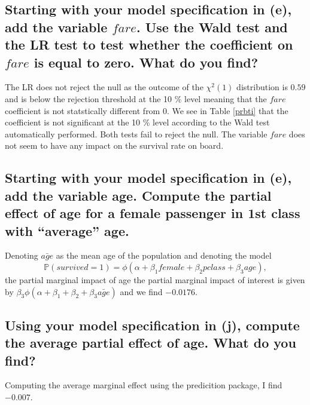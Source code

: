 \documentclass[12pt]{article}
\begin{document}
\subsection{Starting with your model specification in (e), add the variable $fare$. Use the Wald test and the LR test to test whether the coefficient on $fare$ is equal to zero. What do you find?}

The LR does not reject the null as the outcome of the $\chi^2(1)$ distribution is $0.59$ and is below the rejection threshold at the 10 \% level meaning that the $fare$ coefficient is not statstically different from 0. We see in Table \ref{prbti} that the coefficient is not significant at the 10 \% level according to the Wald test automatically performed. Both tests fail to reject the null. The variable $fare$ does not seem to have any impact on the survival rate on board.

\subsection{Starting with your model specification in (e), add the variable age. Compute the partial effect of age for a female passenger in 1st class with “average” age.}

Denoting $\bar{age}$ as the mean age of the population and denoting the model
$$\mathbb{P}(survived = 1) = \phi(\alpha + \beta_1 female + \beta_2 pclass + \beta_3 age),$$ the partial marginal impact of age 
the partial marginal impact of interest is given by $\beta_3 \phi(\alpha + \beta_1 + \beta_2 + \beta_3 \bar{age})$ and we find $-0.0176$.

\subsection{Using your model specification in (j), compute the average partial effect of age. What do you find?}
Computing the average marginal effect using the predicition package, I find $-0.007$.
\end{document}
